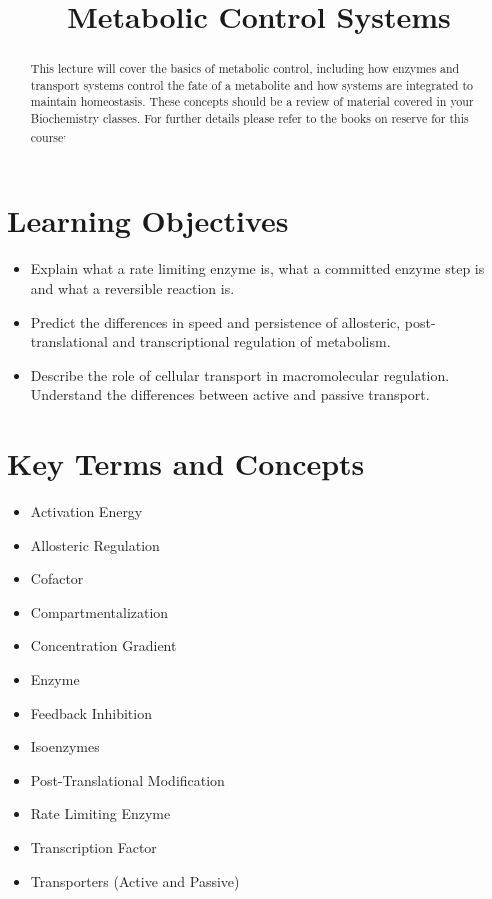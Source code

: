 \documentclass{tufte-handout}
\title{Metabolic Control Systems}
\author{}
\date{}  %
\begin{document}
\maketitle%

\begin{abstract}
\noindent This lecture will cover the basics of metabolic control, including how enzymes and transport systems control the fate of a metabolite and how systems are integrated to maintain homeostasis.  These concepts should be a review of material covered in your Biochemistry classes.  For further details please refer to the books on reserve for this course\cite{Berg2013}\textsuperscript{,}\cite{Ferrier2017}
\end{abstract}

\tableofcontents

\pagebreak
\section{Learning Objectives}

\begin{itemize}
\item Explain what a rate limiting enzyme is, what a committed enzyme step is and what a reversible reaction is.
\item Predict the differences in speed and persistence of allosteric, post-translational and transcriptional regulation of metabolism.
\item Describe the role of cellular transport in macromolecular regulation. Understand the differences between active and passive transport.

\end{itemize}

\section{Key Terms and Concepts}

\begin{itemize}
\item Activation Energy
\item Allosteric Regulation
\item Cofactor
\item Compartmentalization
\item Concentration Gradient
\item Enzyme
\item Feedback Inhibition
\item Isoenzymes
\item Post-Translational Modification
\item Rate Limiting Enzyme
\item Transcription Factor
\item Transporters (Active and Passive)
\end{itemize}
\end{document}
